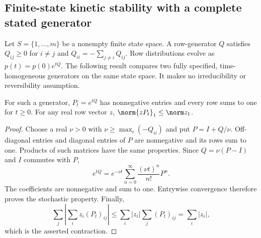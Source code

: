 
\subsection{Finite-state kinetic stability with a complete stated generator}
Let $S=\{1,\ldots,m\}$ be a nonempty finite state space. A row-generator
$Q$ satisfies $Q_{ij}\ge0$ for $i\ne j$ and
$Q_{ii}=-\sum_{j\ne i}Q_{ij}$. Row distributions evolve as
$p(t)=p(0)e^{tQ}$. The following result compares two fully specified,
time-homogeneous generators on the same state space. It makes no
irreducibility or reversibility assumption.

\begin{lemma}
\label{lem:markov}
For such a generator, $P_t=e^{tQ}$ has nonnegative entries and every row
sums to one for $t\ge0$. For any real row vector $z$,
$\norm{zP_t}_1\le\norm z_1$.
\end{lemma}
\begin{proof}
Choose a real $\nu>0$ with $\nu\ge\max_i(-Q_{ii})$ and put
$P=I+Q/\nu$. Off-diagonal entries and diagonal entries of $P$ are
nonnegative and its rows sum to one. Products of such matrices have the
same properties. Since $Q=\nu(P-I)$ and $I$ commutes with $P$,
\[
 e^{tQ}=e^{-\nu t}\sum_{n=0}^\infty\frac{(\nu t)^n}{n!}P^n.
\]
The coefficients are nonnegative and sum to one. Entrywise convergence
therefore proves the stochastic property. Finally,
\[
 \sum_j\left|\sum_i z_i(P_t)_{ij}\right|
 \le\sum_i|z_i|\sum_j(P_t)_{ij}=\sum_i|z_i|,
\]
which is the asserted contraction.
\end{proof}

